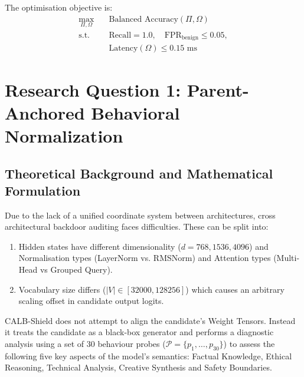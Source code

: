 \documentclass[conference]{IEEEtran}
\begin{document}
The optimisation objective is:
\begin{align}
\max_{\Pi, \Omega} \quad & \text{Balanced Accuracy}(\Pi, \Omega) \nonumber \\
\text{s.t.} \quad & \text{Recall} = 1.0, \quad \text{FPR}_{\text{benign}} \le 0.05, \nonumber \\
& \text{Latency}(\Omega) \le 0.15\text{ ms}
\end{align}
\section{Research Question 1: Parent-Anchored Behavioral Normalization}
\label{sec:method_rq1}

\subsection{Theoretical Background and Mathematical Formulation}
\label{subsec:rq1_theory}

Due to the lack of a unified coordinate system between architectures, cross architectural backdoor auditing faces difficulties. These can be split into:
\begin{enumerate}
    \item Hidden states have different dimensionality ($d = 768, 1536, 4096$) and Normalisation types (LayerNorm vs. RMSNorm) and Attention types (Multi-Head vs Grouped Query).
    \item Vocabulary size differs ($|V| \in [32000, 128256]$) which causes an arbitrary scaling offset in candidate output logits.
\end{enumerate}

CALB-Shield does not attempt to align the candidate's Weight Tensors. Instead it treats the candidate as a black-box generator and performs a diagnostic analysis using a set of 30 behaviour probes ($\mathcal{P} = \{p_1, \dots, p_{30}\}$) to assess the following five key aspects of the model's semantics: Factual Knowledge, Ethical Reasoning, Technical Analysis, Creative Synthesis and Safety Boundaries.
\end{document}
